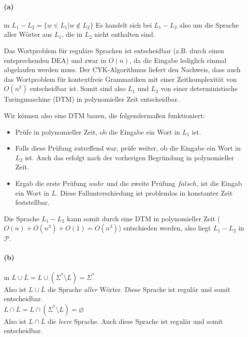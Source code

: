 
\paragraph{(a)}m
	$L_1 - L_2 = \{ w \in L_1 \vert w \notin L_2\}$ Es handelt sich bei $L_1 - L_2$ also um die Sprache aller Wörter aus $L_1$, die in $L_2$ nicht enthalten sind.

	Das Wortproblem für reguläre Sprachen ist entscheidbar (z.B. durch einen entsprechenden DEA) und zwar in $O(n)$, da die Eingabe lediglich einmal abgelaufen werden muss. Der CYK-Algorithmus liefert den Nachweis, dass auch das Wortproblem für kontextfreie Grammatiken mit einer Zeitkomplexität von $O(n^3)$ entscheidbar ist. Somit sind also $L_1$ und $L_2$ von einer deterministische Turingmaschine (DTM) in polynomieller Zeit entscheidbar.
	
	Wir können also eine DTM bauen, die folgendermaßen funktioniert:
	\begin{itemize}
		\item
		Prüfe in polynomieller Zeit, ob die Eingabe ein Wort in $L_1$ ist.
		\item 
		Falls diese Prüfung zutreffend war, prüfe weiter, ob die Eingabe ein Wort in $L_2$ ist. Auch das erfolgt nach der vorherigen Begründung in polynomieller Zeit.
		\item
		Ergab die erste Prüfung $wahr$ und die zweite Prüfung $falsch$, ist die Eingab ein Wort in $L$. Diese Fallunterschiedung ist problemlos in konstanter Zeit feststellbar.
	\end{itemize}
	
	Die Sprache $L_1 - L_2$ kann somit durch eine DTM in polynomieller Zeit ($O(n)+O(n^3)+O(1)=O(n^3)$) entschieden werden, also liegt $L_1 - L_2$ in $\mathcal{P}$.
	
\paragraph{(b)}m
	$L \cup \overline{L} = L \cup (\Sigma^*\setminus L) = \Sigma^*$\\
	Also ist $L \cup \overline{L}$ die Sprache \textit{aller} Wörter. Diese Sprache ist regulär und somit entscheidbar.\\
	$L \cap \overline{L} = L \cap (\Sigma^*\setminus L) = \varnothing $\\
	Also ist $L \cap \overline{L}$ die \textit{leere} Sprache. Auch diese Sprache ist regulär und somit entscheidbar.

